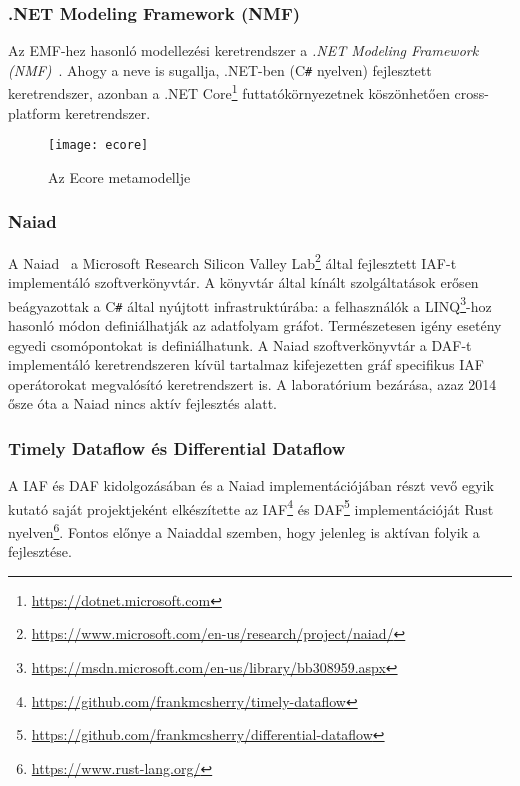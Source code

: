 \subsubsection{.NET Modeling Framework (NMF)}
\label{sec:nmf}

Az EMF-hez hasonló modellezési keretrendszer a \emph{.NET Modeling Framework (NMF)}~\cite{DBLP:conf/icmt/Hinkel18}. Ahogy a neve is sugallja, .NET-ben (C\texttt{\#} nyelven) fejlesztett keretrendszer, azonban a .NET Core\footnote{\url{https://dotnet.microsoft.com}} futtatókörnyezetnek köszönhetően cross-platform keretrendszer.

\begin{figure}[ht]
	\centering
	\texttt{[image: ecore]}
	\caption{Az Ecore metamodellje}
	\label{fig:ecore}
\end{figure}

\subsubsection{Naiad}
\label{sec:naiad}

A Naiad~\cite{DBLP:conf/sosp/MurrayMIIBA13} a Microsoft Research Silicon Valley Lab\footnote{\url{https://www.microsoft.com/en-us/research/project/naiad/}} által fejlesztett IAF-t implementáló szoftverkönyvtár. A könyvtár által kínált szolgáltatások erősen beágyazottak a C\texttt{\#} által nyújtott infrastruktúrába: a felhasználók a  LINQ\footnote{\url{https://msdn.microsoft.com/en-us/library/bb308959.aspx}}-hoz hasonló módon definiálhatják az adatfolyam gráfot. Természetesen igény esetény egyedi csomópontokat is definiálhatunk. A Naiad szoftverkönyvtár a DAF-t implementáló keretrendszeren kívül tartalmaz kifejezetten gráf specifikus IAF operátorokat megvalósító keretrendszert is. A laboratórium bezárása, azaz 2014 ősze óta a Naiad nincs aktív fejlesztés alatt. 

\subsubsection{Timely Dataflow és Differential Dataflow}
\label{sec:differential-dataflow}

A IAF és DAF kidolgozásában és a Naiad implementációjában részt vevő egyik kutató saját projektjeként elkészítette az IAF\footnote{\url{https://github.com/frankmcsherry/timely-dataflow}} és DAF\footnote{\url{https://github.com/frankmcsherry/differential-dataflow}} implementációját Rust nyelven\footnote{\url{https://www.rust-lang.org/}}. Fontos előnye a Naiaddal szemben, hogy jelenleg is aktívan folyik a fejlesztése.
